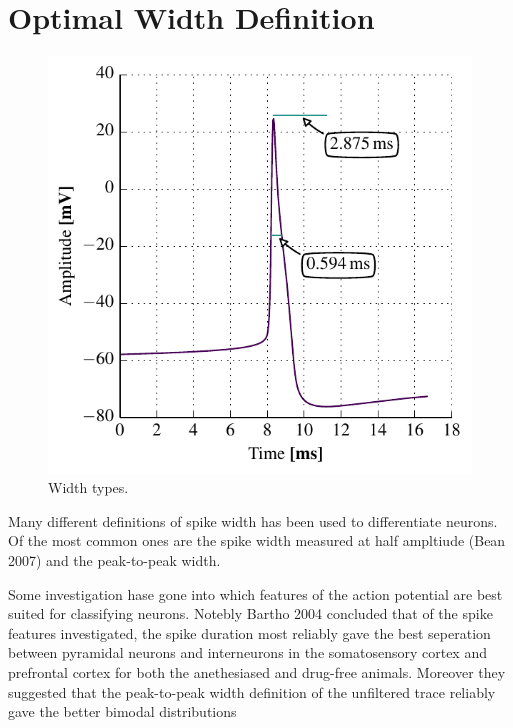 \documentclass[altfont, fleqn]{uiophd}
\begin{document}
\section{Optimal Width Definition}
\begin{figure}
    \vspace{-20pt}
    \begin{center}
        \includegraphics[width=\linewidth]{images/4_2/widthdef_soma_mem_small.pdf}
        \vspace{-20pt}
        \caption{%
            Width types.
            }
        \label{fig:4_2_width_def}
        \vspace{-10pt}
    \end{center}
\end{figure}

Many different definitions of spike width has been used to differentiate neurons.
Of the most common ones are the spike width measured at half ampltiude (Bean 2007) 
and the peak-to-peak width.

Some investigation hase gone into which features of the action potential 
are best suited
for classifying neurons. 
Notebly Bartho 2004 concluded that of the spike features investigated, 
the spike duration most reliably gave the best seperation between pyramidal neurons and
interneurons
in the somatosensory cortex and prefrontal cortex for both the anethesiased
and drug-free animals. 
Moreover they suggested that the peak-to-peak width definition
of the unfiltered trace reliably gave the better bimodal distributions
\end{document}
